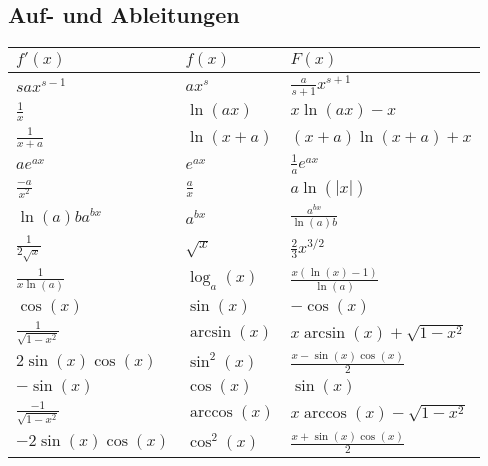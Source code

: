 \subsection{Auf- und Ableitungen}
\begin{tabular}{l | l | l}
    $f'(x)$ & $f(x)$ & $F(x)$\\
    \hline
    $sax^{s-1}$                                                      & $ax^s$                  & $\frac{a}{s + 1}x^{s + 1}$\\
    $\frac{1}{x}$                                                    & $\ln(ax)$               & $x \ln(ax) - x$\\
    $\frac{1}{x + a}$                                                & $\ln(x + a)$            & $(x + a) \ln(x + a) + x$\\
    $ae^{ax}$                                                        & $e^{ax}$                & $\frac{1}{a} e^{ax}$\\
    $\frac{-a}{x^2}$                                                 & $\frac{a}{x}$           & $a\ln(|x|)$\\
    $\ln(a)b a^{b x}$                                                & $a^{bx}$                & $\frac{a^{bx}}{\ln(a)b}$\\
    $\frac{1}{2\sqrt{x}}$                                            & $\sqrt{x}$              & $\frac{2}{3}x^{3/2}$\\
    $\frac{1}{x\ln(a)}$                                              & $\log_a(x)$             & $\frac{x(\ln(x)-1)}{\ln(a)}$\\
    $\cos(x)$                                                        & $\sin(x)$               & $-\cos(x)$\\
    $\frac{1}{\sqrt{1-x^2} }$                                        & $\arcsin(x)$            & $x \arcsin(x) + \sqrt{1 - x^2}$\\
    $2 \sin(x) \cos(x)$                                              & $\sin^2(x)$             & $\frac{x - \sin(x) \cos(x)}{2}$\\
    $-\sin(x)$                                                       & $\cos(x)$               & $\sin(x)$\\
    $\frac{-1}{\sqrt{1-x^2} }$                                       & $\arccos(x)$            & $x \arccos(x) - \sqrt{1 - x^2}$\\
    $-2 \sin(x) \cos(x)$                                             & $\cos^2(x)$             & $\frac{x + \sin(x) \cos(x)}{2}$\\

\end{tabular}
